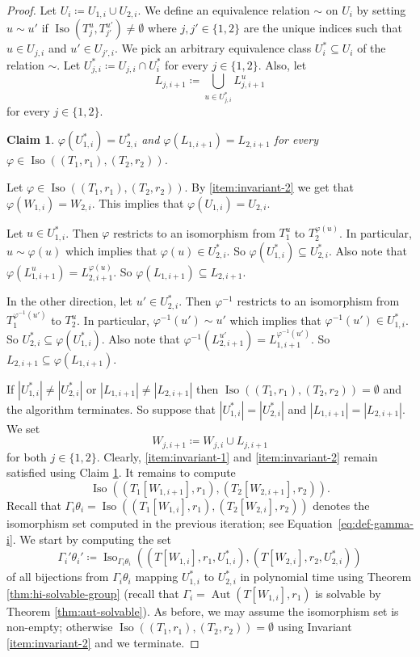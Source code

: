 \PassOptionsToPackage{dvipsnames,svgnames}{xcolor}\documentclass[10pt,a4paper]{article}
\newtheorem{claim}{Claim}[section]
\DeclareMathOperator{\Aut}{Aut}
\DeclareMathOperator{\Iso}{Iso}
\begin{document}
\begin{proof}
 Let $U_{i} \coloneqq U_{1,i} \cup U_{2,i}$.
 We define an equivalence relation $\sim$ on $U_i$ by setting $u \sim u'$ if $\Iso(T_j^u,T_{j'}^{u'}) \neq \emptyset$ where $j,j' \in \{1,2\}$ are the unique indices such that $u \in U_{j,i}$ and $u' \in U_{j',i}$.
 We pick an arbitrary equivalence class $U_i^* \subseteq U_i$ of the relation $\sim$.
 Let $U_{j,i}^* \coloneqq U_{j,i} \cap U_i^*$ for every $j \in \{1,2\}$.
 Also, let
 \[L_{j,i+1} \coloneqq \bigcup_{u \in U_{j,i}^*} L_{j,i+1}^u\]
 for every $j \in \{1,2\}$.

 \begin{claim}
  \label{cl:invariant-extension}
  $\varphi(U_{1,i}^*) = U_{2,i}^*$ and $\varphi(L_{1,i+1}) = L_{2,i+1}$ for every $\varphi \in \Iso((T_1,r_1),(T_2,r_2))$.
 \end{claim}

 \begin{subproof}
  Let $\varphi \in \Iso((T_1,r_1),(T_2,r_2))$.
  By \ref{item:invariant-2} we get that $\varphi(W_{1,i}) = W_{2,i}$.
  This implies that $\varphi(U_{1,i}) = U_{2,i}$.

  Let $u \in U_{1,i}^*$.
  Then $\varphi$ restricts to an isomorphism from $T_1^u$ to $T_2^{\varphi(u)}$.
  In particular, $u \sim \varphi(u)$ which implies that $\varphi(u) \in U_{2,i}^*$.
  So $\varphi(U_{1,i}^*) \subseteq U_{2,i}^*$.
  Also note that $\varphi(L_{1,i+1}^u) = L_{2,i+1}^{\varphi(u)}$.
  So $\varphi(L_{1,i+1}) \subseteq L_{2,i+1}$.

  In the other direction, let $u' \in U_{2,i}^*$.
  Then $\varphi^{-1}$ restricts to an isomorphism from $T_1^{\varphi^{-1}(u')}$ to $T_2^{u}$.
  In particular, $\varphi^{-1}(u') \sim u'$ which implies that $\varphi^{-1}(u') \in U_{1,i}^*$.
  So $U_{2,i}^* \subseteq \varphi(U_{1,i}^*)$.
  Also note that $\varphi^{-1}(L_{2,i+1}^{u'}) = L_{1,i+1}^{\varphi^{-1}(u')}$.
  So $L_{2,i+1} \subseteq \varphi(L_{1,i+1})$.
 \end{subproof}

 If $|U_{1,i}^*| \neq |U_{2,i}^*|$ or $|L_{1,i+1}| \neq |L_{2,i+1}|$ then $\Iso((T_1,r_1),(T_2,r_2)) = \emptyset$ and the algorithm terminates.
 So suppose that $|U_{1,i}^*| = |U_{2,i}^*|$ and $|L_{1,i+1}| = |L_{2,i+1}|$.
 We set
 \[W_{j,i+1} \coloneqq W_{j,i} \cup L_{j,i+1}\]
 for both $j \in \{1,2\}$.
 Clearly, \ref{item:invariant-1} and \ref{item:invariant-2} remain satisfied using Claim \ref{cl:invariant-extension}.
 It remains to compute
 \[\Iso((T_1[W_{1,i+1}],r_1),(T_2[W_{2,i+1}],r_2)).\]
 Recall that $\Gamma_i\theta_i = \Iso((T_1[W_{1,i}],r_1),(T_2[W_{2,i}],r_2))$ denotes the isomorphism set computed in the previous iteration; see Equation~\eqref{eq:def-gamma-i}.
 We start by computing the set
 \[\Gamma_i'\theta_i' \coloneqq \Iso_{\Gamma_i\theta_i}((T[W_{1,i}],r_1,U_{1,i}^*),(T[W_{2,i}],r_2,U_{2,i}^*))
 \]
 of all bijections from $\Gamma_i\theta_i$ mapping $U_{1,i}^*$ to $U_{2,i}^*$ in polynomial time using Theorem \ref{thm:hi-solvable-group}
 (recall that $\Gamma_i = \Aut(T[W_{1,i}],r_1)$ is solvable by Theorem \ref{thm:aut-solvable}).
 As before, we may assume the isomorphism set is non-empty; otherwise $\Iso((T_1,r_1),(T_2,r_2)) = \emptyset$ using Invariant \ref{item:invariant-2} and we terminate.


\end{proof}
\end{document}

